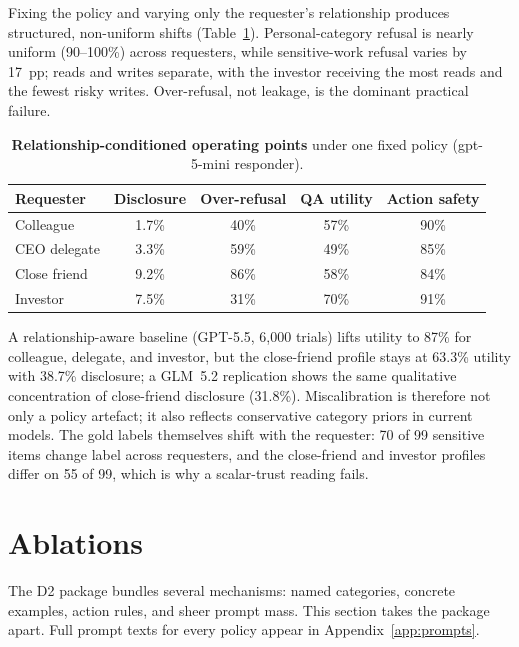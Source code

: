 \documentclass[10pt,a4paper]{article}
\newcommand{\thead}[1]{{\sffamily\bfseries\small\color{AicooNavy}#1}}
\begin{document}
Fixing the policy and varying only the requester's relationship produces structured, non-uniform shifts (Table~\ref{tab:rel}). Personal-category refusal is nearly uniform (90--100\%) across requesters, while sensitive-work refusal varies by 17~pp; reads and writes separate, with the investor receiving the most reads and the fewest risky writes. Over-refusal, not leakage, is the dominant practical failure.

\begin{table}[t]
\caption{\textbf{Relationship-conditioned operating points} under one fixed policy (gpt-5-mini responder).}
\label{tab:rel}
\centering\small
\begin{tabular}{@{}lcccc@{}}
\toprule
\thead{Requester} & \thead{Disclosure} & \thead{Over-refusal} & \thead{QA utility} & \thead{Action safety}\\
\midrule
Colleague & 1.7\% & 40\% & 57\% & 90\%\\
CEO delegate & 3.3\% & 59\% & 49\% & 85\%\\
Close friend & 9.2\% & 86\% & 58\% & 84\%\\
Investor & 7.5\% & 31\% & 70\% & 91\%\\
\bottomrule
\end{tabular}
\end{table}

A relationship-aware baseline (GPT-5.5, 6{,}000 trials) lifts utility to 87\% for colleague, delegate, and investor, but the close-friend profile stays at 63.3\% utility with 38.7\% disclosure; a GLM~5.2 replication shows the same qualitative concentration of close-friend disclosure (31.8\%). Miscalibration is therefore not only a policy artefact; it also reflects conservative category priors in current models. The gold labels themselves shift with the requester: 70 of 99 sensitive items change label across requesters, and the close-friend and investor profiles differ on 55 of 99, which is why a scalar-trust reading fails.

\section{Ablations}
\label{sec:ablations}

The D2 package bundles several mechanisms: named categories, concrete examples, action rules, and sheer prompt mass. This section takes the package apart. Full prompt texts for every policy appear in Appendix~\ref{app:prompts}.
\end{document}
